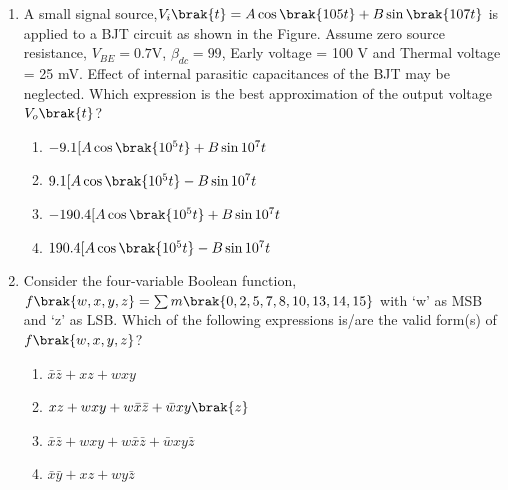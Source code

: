 \begin{enumerate}[label=\thesubsection.\arabic*,ref=\thesubsection.\theenumi]
Which of the following options gives the correct binary representation
$\brak{b_7b_6b_5b_4b_3b_2b_1b_0}$ of the content of the shift register immediately after the
5\textsuperscript{th} clock transition (positive edge)?
\begin{multicols}{4}
	\begin{enumerate}
		\item 00011111
		\item 10111111
		\item 00111111
		\item 11000011
	\end{enumerate}
\end{multicols}
\item A small signal source,$ V_i \brak{t} = A \cos\brak{105t } + B\sin\brak{107 t}$ is applied to a
BJT circuit as shown in the Figure.
Assume zero source resistance, $V_{BE} = 0.7 $V, $\beta_{dc} = 99$, Early voltage = 100 V and
Thermal voltage = 25 mV. Effect of internal parasitic capacitances of the BJT
may be neglected.
Which expression is the best approximation of the output voltage $V_o\brak{t}$?
\begin{enumerate}
	\item $-9.1[A\cos\brak{10^5t}+B\sin{10^7t}$
	\item $9.1[A\cos\brak{10^5t}-B\sin{10^7t}$
	\item $-190.4[A\cos\brak{10^5t}+B\sin{10^7t}$
	\item $190.4[A\cos\brak{10^5t}-B\sin{10^7t}$
\end{enumerate}
\item Consider the four-variable Boolean function,
	$f\brak{w,x,y,z} = \sum m\brak{0,2,5,7,8,10,13,14,15}$ with ‘w’ as MSB and ‘z’ as LSB.
Which of the following expressions is/are the valid form(s) of$ f\brak{w, x, y, z}$?
\begin{enumerate}
	\item $\bar{x}\bar{z}+xz+wxy$
	\item $xz+wxy+w\bar{x}\bar{z}+\bar{w}xy\brak{z}$
	\item $\bar{x}\bar{z}+wxy+w\bar{x}\bar{z}+\bar{w}xy\bar{z}$
	\item $\bar{x}\bar{y}+xz+wy\bar{z}$
\end{enumerate}

\end{enumerate}
